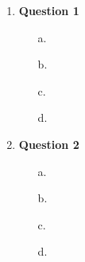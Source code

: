 \documentclass[11pt,letterpaper]{article}
\begin{document}
\begin{enumerate}


    \item {\bf Question 1 }\\

        \begin{solution}
        \begin{sol}
        \begin{itemize}
            \item[a.]
            \item[b.]
            \item[c.]
            \item[d.]
        \end{itemize}
        \end{sol}
        \end{solution}

    \newpage

    \item {\bf Question 2 }\\
        \fbox{\parbox{\linewidth}{

        \begin{itemize}
            \item[a.]
            \item[b.]
            \item[c.]
            \item[d.]
        \end{itemize}
        }}

        \begin{solution}
        \begin{sol}
        \begin{itemize}
            \item[a.]
            \item[b.]
            \item[c.]
            \item[d.]
        \end{itemize}
        \end{sol}
        \end{solution}


\end{enumerate}
\end{document}
